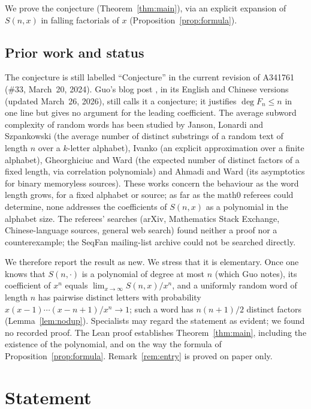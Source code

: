 \documentclass[11pt]{amsart}
\theoremstyle{plain}
\theoremstyle{definition}
\begin{document}
We prove the conjecture (Theorem~\ref{thm:main}), via an explicit expansion of $S(n,x)$ in falling factorials of $x$ (Proposition~\ref{prop:formula}).

\subsection*{Prior work and status}
The conjecture is still labelled ``Conjecture'' in the current revision of A341761 (\#33, March~20, 2024). Guo's blog post \cite{Guo}, in its English and Chinese versions (updated March~26, 2026), still calls it a conjecture; it justifies $\deg F_n\le n$ in one line but gives no argument for the leading coefficient. The average subword complexity of random words has been studied by Janson, Lonardi and Szpankowski \cite{JLS} (the average number of distinct substrings of a random text of length $n$ over a $k$-letter alphabet), Ivanko \cite{Ivanko} (an explicit approximation over a finite alphabet), Gheorghiciuc and Ward \cite{GW} (the expected number of distinct factors of a fixed length, via correlation polynomials) and Ahmadi and Ward \cite{AW} (its asymptotics for binary memoryless sources). These works concern the behaviour as the word length grows, for a fixed alphabet or source; as far as the math0 referees could determine, none addresses the coefficients of $S(n,x)$ as a polynomial in the alphabet size. The referees' searches (arXiv, Mathematics Stack Exchange, Chinese-language sources, general web search) found neither a proof nor a counterexample; the SeqFan mailing-list archive could not be searched directly.

We therefore report the result as new. We stress that it is elementary. Once one knows that $S(n,\cdot)$ is a polynomial of degree at most $n$ (which Guo notes), its coefficient of $x^n$ equals $\lim_{x\to\infty}S(n,x)/x^n$, and a uniformly random word of length $n$ has pairwise distinct letters with probability $x(x-1)\cdots(x-n+1)/x^n\to1$; such a word has $n(n+1)/2$ distinct factors (Lemma~\ref{lem:nodup}). Specialists may regard the statement as evident; we found no recorded proof.
The Lean proof establishes Theorem~\ref{thm:main}, including the existence of the polynomial, and on the way the formula of Proposition~\ref{prop:formula}. Remark~\ref{rem:entry} is proved on paper only.

\section{Statement}\label{sec:statement}
\end{document}

